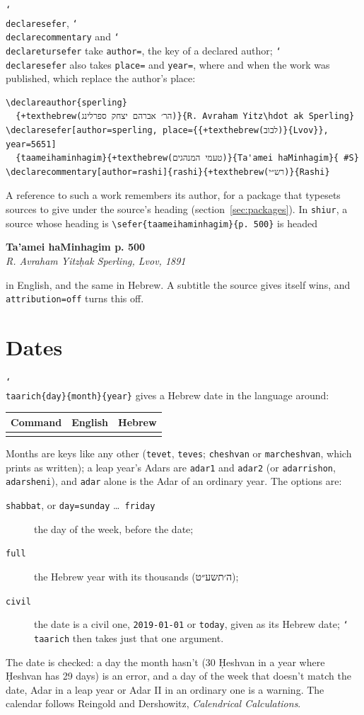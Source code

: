 \documentclass[11pt]{article}
\makeatletter
\newcommand{\cs}[1]{\texttt{\char`\\#1}}
\newenvironment{examples}
	{\begin{center}\small\begin{tabular}{@{}lll@{}}\toprule Command & English & Hebrew \\ \midrule}
	{\bottomrule\end{tabular}\end{center}}
\makeatother
\begin{document}
\cs{declaresefer}, \cs{declarecommentary} and \cs{declaretursefer} take \texttt{author=}, the key
of a declared author; \cs{declaresefer} also takes \texttt{place=} and \texttt{year=}, where and
when the work was published, which replace the author's place:
\begin{Verbatim}[commandchars=+\(\)]
\declareauthor{sperling}
  {+texthebrew(הר׳ אברהם יצחק ספרלינג)}{R. Avraham Yitz\hdot ak Sperling}
\declaresefer[author=sperling, place={{+texthebrew(לבוב)}{Lvov}}, year=5651]
  {taameihaminhagim}{+texthebrew(טעמי המנהגים)}{Ta'amei haMinhagim}{ #S}
\declarecommentary[author=rashi]{rashi}{+texthebrew(רש״י)}{Rashi}
\end{Verbatim}
A reference to such a work remembers its author, for a package that typesets sources to give
under the source's heading (section~\ref{sec:packages}). In \texttt{shiur}, a source whose
heading is \verb|\sefer{taameihaminhagim}{p. 500}| is headed
\begin{center}
\textbf{Ta'amei haMinhagim p. 500}\\
\textit{R. Avraham Yitzḥak Sperling, Lvov, 1891}
\end{center}
in English, and the same in Hebrew. A subtitle the source gives itself wins, and
\texttt{attribution=off} turns this off.

\section{Dates}\label{sec:dates}

\cs{taarich}\verb|{day}{month}{year}| gives a Hebrew date in the language around:
\begin{examples}
\row{\taarich{24}{tevet}{5779}}
\row{\taarich[shabbat]{25}{kislev}{5750}}
\row{\taarich[day=tuesday]{4}{nisan}{5704}}
\row{\taarich[full]{1}{adar2}{5784}}
\row{\taarich[civil]{2019-01-01}}
\end{examples}
Months are keys like any other (\texttt{tevet}, \texttt{teves}; \texttt{cheshvan} or
\texttt{marcheshvan}, which prints as written); a leap year's Adars are \texttt{adar1} and
\texttt{adar2} (or \texttt{adarrishon}, \texttt{adarsheni}), and \texttt{adar} alone is the Adar
of an ordinary year. The options are:
\begin{description}
\item[\texttt{shabbat}, or \texttt{day=sunday} \ldots\ \texttt{friday}] the day of the week,
before the date;
\item[\texttt{full}] the Hebrew year with its thousands (\texthebrew{ה׳תשע״ט});
\item[\texttt{civil}] the date is a civil one, \texttt{2019-01-01} or \texttt{today}, given as
its Hebrew date; \cs{taarich} then takes just that one argument.
\end{description}
The date is checked: a day the month hasn't (30 Ḥeshvan in a year where Ḥeshvan has 29 days) is
an error, and a day of the week that doesn't match the date, Adar in a leap year or Adar II in
an ordinary one is a warning. The calendar follows Reingold and Dershowitz,
\textit{Calendrical Calculations}.
\end{document}
